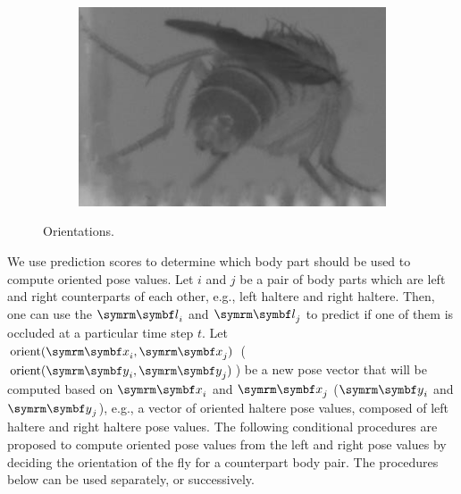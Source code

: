 \begin{figure}[ht!]
\begin{subfigure}[b]{0.24\linewidth}
		\centering\includegraphics[width=\linewidth]{figures/FlyOrientation-Perpendicular.png}
		\caption{\label{figure:perpendicular-orientation}}
	\end{subfigure}
	\caption{Orientations.}
\end{figure}

We use prediction scores to determine which body part should be used to compute oriented pose values.
Let $i$ and $j$ be a pair of body parts which are left and right counterparts of each other, e.g., left haltere and right haltere.
Then, one can use the $\V{l}_i$ and $\V{l}_j$ to predict if one of them is occluded at a particular time step $t$.
Let $\orient{\V{x}_i, \V{x}_j}$ ($\orient{\V{y}_i, \V{y}_j}$) be a new pose vector that will be computed based on $\V{x}_i$ and $\V{x}_j$ ($\V{y}_i$ and $\V{y}_j$), e.g., a vector of oriented haltere pose values, composed of left haltere and right haltere pose values.
The following conditional procedures are proposed to compute oriented pose values from the left and right pose values by deciding the orientation of the fly for a counterpart body pair. The procedures below can be used separately, or successively.

